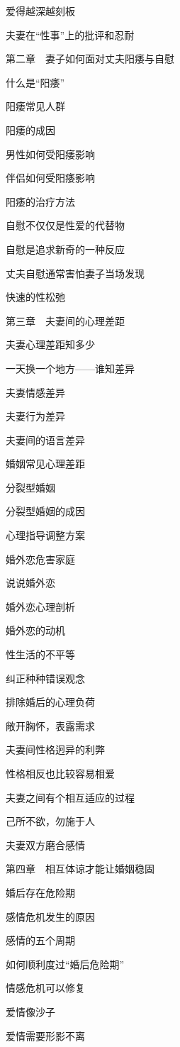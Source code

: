 \documentclass[12pt,UTF8]{ctexbook}
\begin{document}
爱得越深越刻板

夫妻在“性事”上的批评和忍耐

第二章　妻子如何面对丈夫阳痿与自慰

什么是“阳痿”

阳痿常见人群

阳痿的成因

男性如何受阳痿影响

伴侣如何受阳痿影响

阳痿的治疗方法

自慰不仅仅是性爱的代替物

自慰是追求新奇的一种反应

丈夫自慰通常害怕妻子当场发现

快速的性松弛

第三章　夫妻间的心理差距

夫妻心理差距知多少

一天换一个地方——谁知差异

夫妻情感差异

夫妻行为差异

夫妻间的语言差异

婚姻常见心理差距

分裂型婚姻

分裂型婚姻的成因

心理指导调整方案

婚外恋危害家庭

说说婚外恋

婚外恋心理剖析

婚外恋的动机

性生活的不平等

纠正种种错误观念

排除婚后的心理负荷

敞开胸怀，表露需求

夫妻间性格迥异的利弊

性格相反也比较容易相爱

夫妻之间有个相互适应的过程

己所不欲，勿施于人

夫妻双方磨合感情

第四章　相互体谅才能让婚姻稳固

婚后存在危险期

感情危机发生的原因

感情的五个周期

如何顺利度过“婚后危险期”

情感危机可以修复

爱情像沙子

爱情需要形影不离
\end{document}
